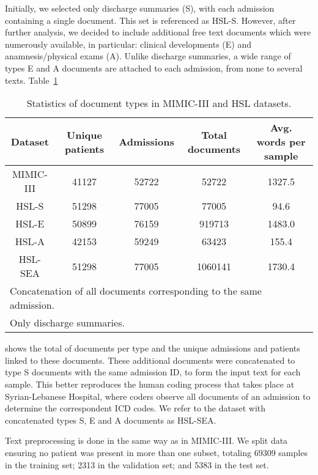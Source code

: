 \documentclass[runningheads]{llncs}
\begin{document}
Initially, we selected only discharge summaries (S), with each admission containing a single document. This set is referenced as HSL-S. However, after further analysis, we decided to include additional free text documents which were numerously available, in particular: clinical developments (E) and anamnesis/physical exams (A). Unlike discharge summaries, a wide range of types E and A documents are attached to each admission, from none to several texts. Table~\ref{tab:dataset_document_types}
\begin{table}[t]
	\centering
	\caption{Statistics of document types in MIMIC-III and HSL datasets.}
	\begin{tabular}{c|c|c|c|c}
		        Dataset          & Unique patients & Admissions & Total documents & Avg. words per sample \\ \hline\hline
		MIMIC-III &      41127      &   52722    &      52722      &                 1327.5                  \\ \hline
		         HSL-S           &      51298      &   77005    &      77005      &                  94.6                   \\ \hline
		         HSL-E           &      50899      &   76159    &     919713      &                 1483.0                  \\ \hline
		         HSL-A           &      42153      &   59249    &      63423      &                  155.4                  \\ \hline
		        HSL-SEA          &      51298      &   77005    &     1060141     &                 1730.4                  \\ \hline
		\multicolumn{5}{l}{Concatenation of all documents corresponding to the same admission.}              \\
		\multicolumn{5}{l}{Only discharge summaries.}
	\end{tabular}
	\label{tab:dataset_document_types}
\end{table}
shows the total of documents per type and the unique admissions and patients linked to these documents. These additional documents were concatenated to type S documents with the same admission ID, to form the input text for each sample. This better reproduces the human coding process that takes place at Syrian-Lebanese Hospital, where coders observe all documents of an admission to determine the correspondent ICD codes. We refer to the dataset with concatenated types S, E and A documents as HSL-SEA.

Text preprocessing is done in the same way as in MIMIC-III. We split data ensuring no patient was present in more than one subset, totaling 69309 samples in the training set; 2313 in the validation set; and 5383 in the test set.
\end{document}
